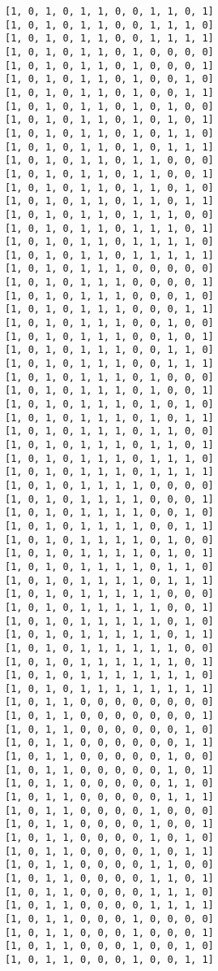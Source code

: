\documentclass[11pt]{article}
\begin{document}
\begin{Verbatim}[commandchars=\\\{\}]
[1, 0, 1, 0, 1, 1, 0, 0, 1, 1, 0, 1]
[1, 0, 1, 0, 1, 1, 0, 0, 1, 1, 1, 0]
[1, 0, 1, 0, 1, 1, 0, 0, 1, 1, 1, 1]
[1, 0, 1, 0, 1, 1, 0, 1, 0, 0, 0, 0]
[1, 0, 1, 0, 1, 1, 0, 1, 0, 0, 0, 1]
[1, 0, 1, 0, 1, 1, 0, 1, 0, 0, 1, 0]
[1, 0, 1, 0, 1, 1, 0, 1, 0, 0, 1, 1]
[1, 0, 1, 0, 1, 1, 0, 1, 0, 1, 0, 0]
[1, 0, 1, 0, 1, 1, 0, 1, 0, 1, 0, 1]
[1, 0, 1, 0, 1, 1, 0, 1, 0, 1, 1, 0]
[1, 0, 1, 0, 1, 1, 0, 1, 0, 1, 1, 1]
[1, 0, 1, 0, 1, 1, 0, 1, 1, 0, 0, 0]
[1, 0, 1, 0, 1, 1, 0, 1, 1, 0, 0, 1]
[1, 0, 1, 0, 1, 1, 0, 1, 1, 0, 1, 0]
[1, 0, 1, 0, 1, 1, 0, 1, 1, 0, 1, 1]
[1, 0, 1, 0, 1, 1, 0, 1, 1, 1, 0, 0]
[1, 0, 1, 0, 1, 1, 0, 1, 1, 1, 0, 1]
[1, 0, 1, 0, 1, 1, 0, 1, 1, 1, 1, 0]
[1, 0, 1, 0, 1, 1, 0, 1, 1, 1, 1, 1]
[1, 0, 1, 0, 1, 1, 1, 0, 0, 0, 0, 0]
[1, 0, 1, 0, 1, 1, 1, 0, 0, 0, 0, 1]
[1, 0, 1, 0, 1, 1, 1, 0, 0, 0, 1, 0]
[1, 0, 1, 0, 1, 1, 1, 0, 0, 0, 1, 1]
[1, 0, 1, 0, 1, 1, 1, 0, 0, 1, 0, 0]
[1, 0, 1, 0, 1, 1, 1, 0, 0, 1, 0, 1]
[1, 0, 1, 0, 1, 1, 1, 0, 0, 1, 1, 0]
[1, 0, 1, 0, 1, 1, 1, 0, 0, 1, 1, 1]
[1, 0, 1, 0, 1, 1, 1, 0, 1, 0, 0, 0]
[1, 0, 1, 0, 1, 1, 1, 0, 1, 0, 0, 1]
[1, 0, 1, 0, 1, 1, 1, 0, 1, 0, 1, 0]
[1, 0, 1, 0, 1, 1, 1, 0, 1, 0, 1, 1]
[1, 0, 1, 0, 1, 1, 1, 0, 1, 1, 0, 0]
[1, 0, 1, 0, 1, 1, 1, 0, 1, 1, 0, 1]
[1, 0, 1, 0, 1, 1, 1, 0, 1, 1, 1, 0]
[1, 0, 1, 0, 1, 1, 1, 0, 1, 1, 1, 1]
[1, 0, 1, 0, 1, 1, 1, 1, 0, 0, 0, 0]
[1, 0, 1, 0, 1, 1, 1, 1, 0, 0, 0, 1]
[1, 0, 1, 0, 1, 1, 1, 1, 0, 0, 1, 0]
[1, 0, 1, 0, 1, 1, 1, 1, 0, 0, 1, 1]
[1, 0, 1, 0, 1, 1, 1, 1, 0, 1, 0, 0]
[1, 0, 1, 0, 1, 1, 1, 1, 0, 1, 0, 1]
[1, 0, 1, 0, 1, 1, 1, 1, 0, 1, 1, 0]
[1, 0, 1, 0, 1, 1, 1, 1, 0, 1, 1, 1]
[1, 0, 1, 0, 1, 1, 1, 1, 1, 0, 0, 0]
[1, 0, 1, 0, 1, 1, 1, 1, 1, 0, 0, 1]
[1, 0, 1, 0, 1, 1, 1, 1, 1, 0, 1, 0]
[1, 0, 1, 0, 1, 1, 1, 1, 1, 0, 1, 1]
[1, 0, 1, 0, 1, 1, 1, 1, 1, 1, 0, 0]
[1, 0, 1, 0, 1, 1, 1, 1, 1, 1, 0, 1]
[1, 0, 1, 0, 1, 1, 1, 1, 1, 1, 1, 0]
[1, 0, 1, 0, 1, 1, 1, 1, 1, 1, 1, 1]
[1, 0, 1, 1, 0, 0, 0, 0, 0, 0, 0, 0]
[1, 0, 1, 1, 0, 0, 0, 0, 0, 0, 0, 1]
[1, 0, 1, 1, 0, 0, 0, 0, 0, 0, 1, 0]
[1, 0, 1, 1, 0, 0, 0, 0, 0, 0, 1, 1]
[1, 0, 1, 1, 0, 0, 0, 0, 0, 1, 0, 0]
[1, 0, 1, 1, 0, 0, 0, 0, 0, 1, 0, 1]
[1, 0, 1, 1, 0, 0, 0, 0, 0, 1, 1, 0]
[1, 0, 1, 1, 0, 0, 0, 0, 0, 1, 1, 1]
[1, 0, 1, 1, 0, 0, 0, 0, 1, 0, 0, 0]
[1, 0, 1, 1, 0, 0, 0, 0, 1, 0, 0, 1]
[1, 0, 1, 1, 0, 0, 0, 0, 1, 0, 1, 0]
[1, 0, 1, 1, 0, 0, 0, 0, 1, 0, 1, 1]
[1, 0, 1, 1, 0, 0, 0, 0, 1, 1, 0, 0]
[1, 0, 1, 1, 0, 0, 0, 0, 1, 1, 0, 1]
[1, 0, 1, 1, 0, 0, 0, 0, 1, 1, 1, 0]
[1, 0, 1, 1, 0, 0, 0, 0, 1, 1, 1, 1]
[1, 0, 1, 1, 0, 0, 0, 1, 0, 0, 0, 0]
[1, 0, 1, 1, 0, 0, 0, 1, 0, 0, 0, 1]
[1, 0, 1, 1, 0, 0, 0, 1, 0, 0, 1, 0]
[1, 0, 1, 1, 0, 0, 0, 1, 0, 0, 1, 1]

\end{Verbatim}
\end{document}
